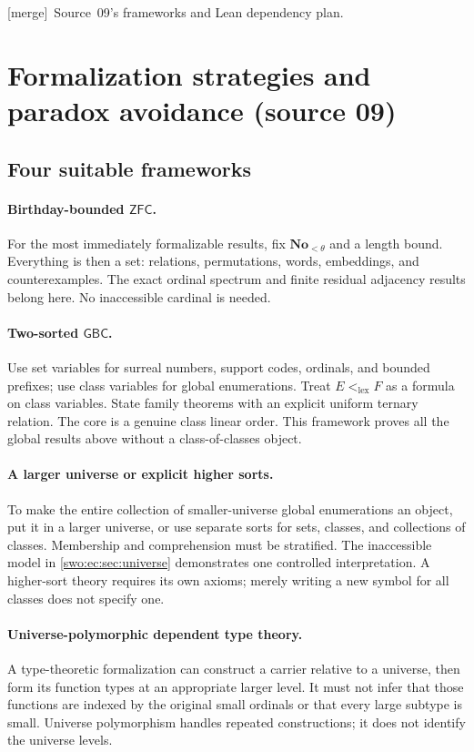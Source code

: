 \documentclass[11pt]{article}
\theoremstyle{definition}
\theoremstyle{remark}
\newcommand{\No}{\mathbf{No}}
\newcommand{\lex}{\mathrm{lex}}
\newcommand{\GBC}{\mathsf{GBC}}
\newcommand{\ZFC}{\mathsf{ZFC}}
\newcommand{\merge}{\textsf{[merge]}}
\begin{document}

\merge\ Source~09's frameworks and Lean dependency plan.

\section{Formalization strategies and paradox avoidance (source 09)}
\label{swo:ec:sec:formalization}
\subsection{Four suitable frameworks}
\paragraph{Birthday-bounded $\ZFC$.}
For the most immediately formalizable results, fix $\No_{<\theta}$ and a
length bound. Everything is then a set: relations, permutations, words,
embeddings, and counterexamples. The exact ordinal spectrum and finite
residual adjacency results belong here. No inaccessible cardinal is
needed.

\paragraph{Two-sorted $\GBC$.}
Use set variables for surreal numbers, support codes, ordinals, and
bounded prefixes; use class variables for global enumerations. Treat
$E<_{\lex}F$ as a formula on class variables. State family theorems with
an explicit uniform ternary relation. The core is a genuine class
linear order. This framework proves all the global results above without
a class-of-classes object.

\paragraph{A larger universe or explicit higher sorts.}
To make the entire collection of smaller-universe global enumerations
an object, put it in a larger universe, or use separate sorts for sets,
classes, and collections of classes. Membership and comprehension must
be stratified. The inaccessible model in \cref{swo:ec:sec:universe} demonstrates
one controlled interpretation. A higher-sort theory requires its own
axioms; merely writing a new symbol for all classes does not specify one.

\paragraph{Universe-polymorphic dependent type theory.}
A type-theoretic formalization can construct a carrier relative to a
universe, then form its function types at an appropriate larger level.
It must not infer that those functions are indexed by the original
small ordinals or that every large subtype is small. Universe
polymorphism handles repeated constructions; it does not identify the
universe levels.
\end{document}
